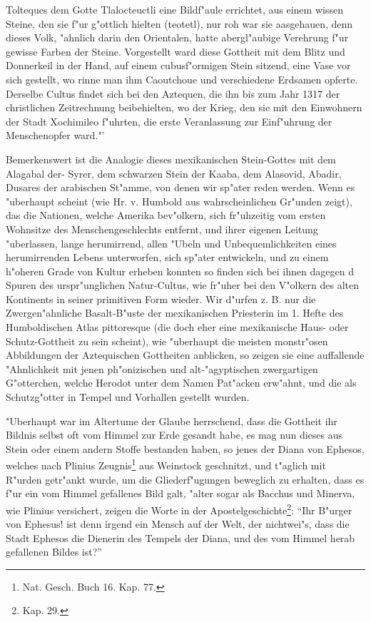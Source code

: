 \documentclass[a4paper, 11pt, oneside, polutonikogreek, german]{article}
\begin{document}
Tolteques dem Gotte Tlalocteuctli eine Bildf"aule errichtet, aus einem wissen Steine, den sie f"ur g"ottlich hielten (teotetl), nur roh war sie aasgehauen, denn dieses Volk, "ahnlich darin den Orientalen, hatte abergl"aubige Verehrung f"ur gewisse Farben der Steine. Vorgestellt ward diese Gottheit mit dem Blitz und Donnerkeil in der Hand, auf einem cubusf"ormigen Stein sitzend, eine Vase vor sich gestellt, wo rinne man ihm Caoutchoue und verschiedene Erdsamen opferte. Derselbe Cultus findet sich bei den Aztequen, die ihn bis zum Jahr 1317 der christlichen Zeitrechnung beibehielten, wo der Krieg, den sie mit den Einwohnern der Stadt Xochimileo f"uhrten, die erste Veranlassung zur Einf"uhrung der Menschenopfer ward."'

Bemerkenswert ist die Analogie dieses mexikanischen Stein-Gottes mit dem Alagabal der- Syrer, dem schwarzen Stein der Kaaba, dem Alasovid, Abadir, Dusares der arabischen St"amme, von denen wir sp"ater reden werden. Wenn es "uberhaupt scheint (wie Hr. v. Humbold aus wahrscheinlichen Gr"unden zeigt), das die Nationen, welche Amerika bev"olkern, sich fr"uhzeitig vom ersten Wohnsitze des Menschengeschlechts entfernt, und ihrer eigenen Leitung "uberlassen, lange herumirrend, allen "Ubeln und Unbequemlichkeiten eines herumirrenden Lebens unterworfen, sich sp"ater entwickeln, und zu einem h"oheren Grade von Kultur erheben konnten so finden sich bei ihnen dagegen d Spuren des urspr"unglichen Natur-Cultus, wie fr"uher bei den V"olkern des alten Kontinents in seiner primitiven Form wieder. Wir d"urfen z. B. nur die Zwergen"ahnliche Basalt-B"uste der mexikanischen Priesterin im 1. Hefte des Humboldischen Atlas pittoresque (die doch eher eine mexikanische Haus- oder Schutz-Gottheit zu sein scheint), wie "uberhaupt die meisten monstr"osen Abbildungen der Aztequischen Gottheiten anblicken, so zeigen sie eine auffallende "Ahnlichkeit mit jenen ph"onizischen und alt-"agyptischen zwergartigen G"otterchen, welche Herodot unter dem Namen Pat"acken erw"ahnt, und die als Schutzg"otter in Tempel und Vorhallen gestellt wurden.

"Uberhaupt war im Altertume der Glaube herrschend, dass die Gottheit ihr Bildnis selbst oft vom Himmel zur Erde gesandt habe, es mag nun dieses aus Stein oder einem andern Stoffe bestanden haben, so jenes der Diana von Ephesos, welches nach Plinius Zeugnis\footnote{Nat. Gesch. Buch 16. Kap. 77.} aus Weinstock geschnitzt, und t"aglich mit R"urden getr"ankt wurde, um die Gliederf"ugungen beweglich zu erhalten, dass es f"ur ein vom Himmel gefallenes Bild galt, "alter sogar als Bacchus und Minerva, wie Plinius versichert, zeigen die Worte in der Apostelgeschichte\footnote{Kap. 29.}: "`Ihr B"urger von Ephesus! ist denn irgend ein Mensch auf der Welt, der nichtwei"s, dass die Stadt Ephesos die Dienerin des Tempels der Diana, und des vom Himmel herab gefallenen Bildes ist?"'
\end{document}
